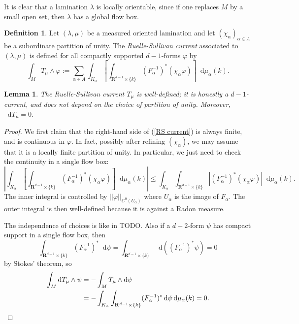 \documentclass[reqno,10pt]{amsart}
\newcommand{\RR}{\mathbf{R}}
\newcommand*\dif{\mathop{}\!\mathrm{d}}
\newcommand{\dfn}[1]{\emph{#1}\index{#1}}
\newtheorem{lemma}[theorem]{Lemma}
\theoremstyle{definition}
\newtheorem{definition}[theorem]{Definition}
\numberwithin{equation}{section}
\begin{document}
It is clear that a lamination $\lambda$ is locally orientable, since if one replaces $M$ by a small open set, then $\lambda$ has a global flow box.

\begin{definition}
Let $(\lambda, \mu)$ be a measured oriented lamination and let $(\chi_\alpha)_{\alpha \in A}$ be a subordinate partition of unity.
The \dfn{Ruelle-Sullivan current} associated to $(\lambda, \mu)$ is defined for all compactly supported $d-1$-forms $\varphi$ by
\begin{equation}\label{RS current}
\int_M T_\mu \wedge \varphi := \sum_{\alpha \in A} \int_{K_\alpha} \left[\int_{\RR^{d - 1} \times \{k\}} (F_\alpha^{-1})^* (\chi_\alpha \varphi) \right] \dif \mu_\alpha(k).
\end{equation}
\end{definition}

\begin{lemma}
The Ruelle-Sullivan current $T_\mu$ is well-defined; it is honestly a $d-1$-current, and does not depend on the choice of partition of unity.
Moreover, $\dif T_\mu = 0$.
\end{lemma}
\begin{proof}
We first claim that the right-hand side of (\ref{RS current}) is always finite, and is continuous in $\varphi$.
In fact, possibly after refining $(\chi_\alpha)$, we may assume that it is a locally finite partition of unity.
In particular, we just need to check the continuity in a single flow box:
$$\left|\int_{K_\alpha} \left[\int_{\RR^{d - 1} \times \{k\}} (F_\alpha^{-1})^* (\chi_\alpha \varphi) \right] \dif \mu_\alpha(k)\right| \leq \int_{K_\alpha} \int_{\RR^{d - 1} \times \{k\}} |(F_\alpha^{-1})^* (\chi_\alpha \varphi)| \dif \mu_\alpha(k).$$
The inner integral is controlled by $||\varphi||_{C^0(U_\alpha)}$ where $U_\alpha$ is the image of $F_\alpha$.
The outer integral is then well-defined because it is against a Radon measure.

The independence of choices is like in \cite[Theorem 8.2]{daskalopoulos2020transverse} TODO.
Also if a $d-2$-form $\psi$ has compact support in a single flow box, then
$$\int_{\RR^{d - 1} \times \{k\}} (F_\alpha^{-1})^* \dif \psi = \int_{\RR^{d - 1} \times \{k\}} \dif((F_\alpha^{-1})^* \psi) = 0$$
by Stokes' theorem, so
\begin{align*}
\int_M \dif T_\mu \wedge \psi &= -\int_M T_\mu \wedge \dif \psi \\
&= -\int_{K_\alpha} \int_{\RR^{d - 1} \times \{k\}} (F_\alpha^{-1})^* \dif \psi \dif \mu_\alpha(k) = 0. \qedhere
\end{align*}
\end{proof}
\end{document}
